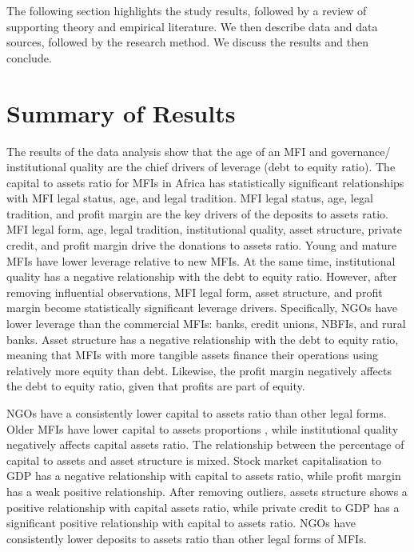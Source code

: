 \documentclass[a4paper, nobind]{templates/ociamthesis}
\begin{document}
The following section highlights the study results, followed by a review of supporting theory and empirical literature. We then describe data and data sources, followed by the research method. We discuss the results and then conclude.

\hypertarget{summary-of-results-4}{%
\section{Summary of Results}\label{summary-of-results-4}}

The results of the data analysis show that the age of an MFI and governance/ institutional quality are the chief drivers of leverage (debt to equity ratio). The capital to assets ratio for MFIs in Africa has statistically significant relationships with MFI legal status, age, and legal tradition. MFI legal status, age, legal tradition, and profit margin are the key drivers of the deposits to assets ratio. MFI legal form, age, legal tradition, institutional quality, asset structure, private credit, and profit margin drive the donations to assets ratio. Young and mature MFIs have lower leverage relative to new MFIs. At the same time, institutional quality has a negative relationship with the debt to equity ratio. However, after removing influential observations, MFI legal form, asset structure, and profit margin become statistically significant leverage drivers. Specifically, NGOs have lower leverage than the commercial MFIs: banks, credit unions, NBFIs, and rural banks. Asset structure has a negative relationship with the debt to equity ratio, meaning that MFIs with more tangible assets finance their operations using relatively more equity than debt. Likewise, the profit margin negatively affects the debt to equity ratio, given that profits are part of equity.

NGOs have a consistently lower capital to assets ratio than other legal forms. Older MFIs have lower capital to assets proportions , while institutional quality negatively affects capital assets ratio. The relationship between the percentage of capital to assets and asset structure is mixed. Stock market capitalisation to GDP has a negative relationship with capital to assets ratio, while profit margin has a weak positive relationship. After removing outliers, assets structure shows a positive relationship with capital assets ratio, while private credit to GDP has a significant positive relationship with capital to assets ratio. NGOs have consistently lower deposits to assets ratio than other legal forms of MFIs.
\end{document}

